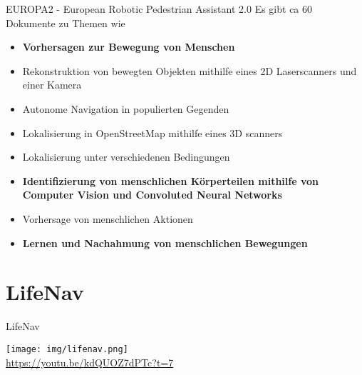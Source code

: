 \documentclass[aspectratio=1610]{beamer}
\begin{document}
  \begin{frame}{EUROPA2 - European Robotic Pedestrian Assistant 2.0}
  	Es gibt ca 60 Dokumente zu Themen wie
  	\begin{itemize}
  		\item \textbf{Vorhersagen zur Bewegung von Menschen}
  		\pause
  		\item Rekonstruktion von bewegten Objekten mithilfe eines 2D Laserscanners und einer Kamera
  		\pause
  		\item Autonome Navigation in populierten Gegenden
  		\pause
  		\item Lokalisierung in OpenStreetMap mithilfe eines 3D scanners
  		\pause
  		\item Lokalisierung unter verschiedenen Bedingungen
  		\pause
  		\item \textbf{Identifizierung von menschlichen Körperteilen mithilfe von Computer Vision und Convoluted Neural Networks}
  		\pause
  		\item Vorhersage von menschlichen Aktionen
  		\pause
  		\item \textbf{Lernen und Nachahmung von menschlichen Bewegungen}
  	\end{itemize}
  \end{frame}
  
  \section{LifeNav}
  \begin{frame}{LifeNav}
  	\begin{center}
  		\texttt{[image: img/lifenav.png]} \\
  		\url{https://youtu.be/kdQUOZ7dPTc?t=7}
  	\end{center}
  \end{frame}
  
\end{document}
